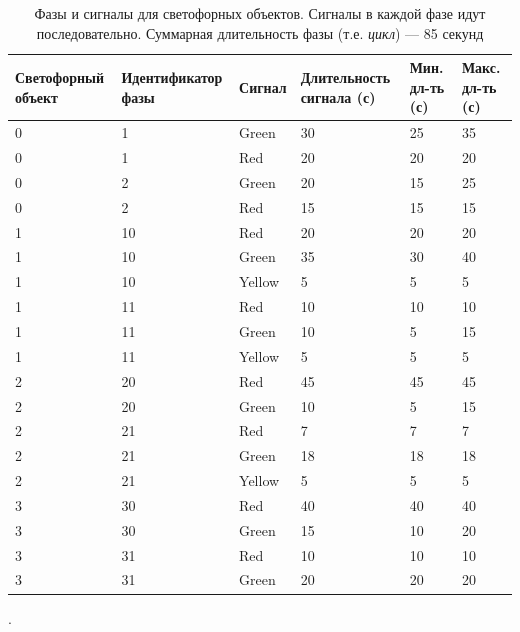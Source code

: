 \documentclass[12pt]{article}
\begin{document}
\begin{table}[h!]
\centering
\small
\caption{Фазы и сигналы для светофорных объектов. Сигналы в каждой фазе идут последовательно. Суммарная длительность фазы (т.е. \textit{цикл}) — 85 секунд}
\begin{tabular}{|p{2.6cm}|p{3.2cm}|p{1.4cm}|p{3.2cm}|p{1.5cm}|p{1.5cm}|}
\hline
\textbf{Светофорный объект} & \textbf{Идентификатор фазы} & \textbf{Сигнал} & \textbf{Длительность сигнала (с)} & \textbf{Мин. дл-ть (с)} & \textbf{Макс. дл-ть (с)} \\
\hline
0 & 1 & Green & 30 & 25 & 35 \\
0 & 1 & Red   & 20 & 20 & 20 \\
0 & 2 & Green & 20 & 15 & 25 \\
0 & 2 & Red   & 15 & 15 & 15 \\
\hline
1 & 10 & Red   & 20 & 20 & 20 \\
1 & 10 & Green & 35 & 30 & 40 \\
1 & 10 & Yellow& 5  & 5  & 5  \\
1 & 11 & Red   & 10 & 10 & 10 \\
1 & 11 & Green & 10 & 5  & 15 \\
1 & 11 & Yellow& 5  & 5  & 5  \\
\hline
2 & 20 & Red   & 45 & 45 & 45 \\
2 & 20 & Green & 10 & 5  & 15 \\
2 & 21 & Red   & 7  & 7  & 7  \\
2 & 21 & Green & 18 & 18 & 18 \\
2 & 21 & Yellow& 5  & 5  & 5  \\
\hline
3 & 30 & Red   & 40 & 40 & 40 \\
3 & 30 & Green & 15 & 10 & 20 \\
3 & 31 & Red & 10 & 10 & 10 \\
3 & 31 & Green & 20 & 20 & 20 \\
\hline
\end{tabular}
\end{table}
\vspace{20cm}.
\newpage
\end{document}
